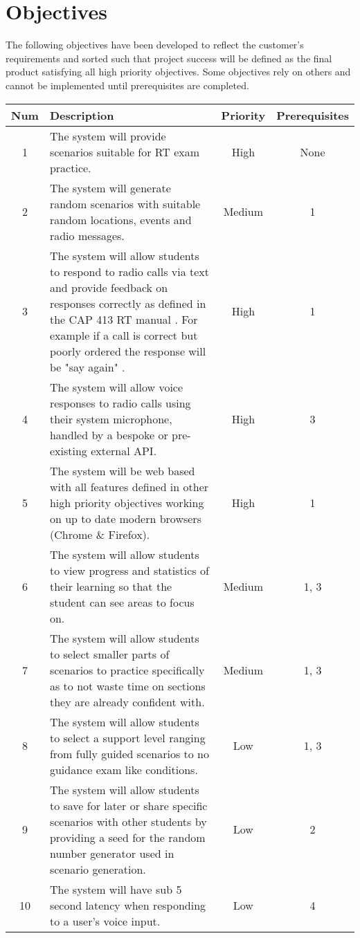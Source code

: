 \section{Objectives}
The following objectives have been developed to reflect the customer's requirements and sorted such that project success will be defined as the final product satisfying all high priority objectives. Some objectives rely on others and cannot be implemented until prerequisites are completed.

\begin{center}
    \begin{tabular}{ | c | m{22.7em} | c | c | }
        \hline
        \bf{Num} & \bf{Description} & \bf{Priority} & \bf{Prerequisites} \\
        \hline
        1 & The system will provide scenarios suitable for RT exam practice. & High & None \\
        \hline
        2 & The system will generate random scenarios with suitable random locations, events and radio messages. & Medium & 1 \\
        \hline
        3 & The system will allow students to respond to radio calls via text and provide feedback on responses correctly as defined in the CAP 413 RT manual \cite{CAP413}. For example if a call is correct but poorly ordered the response will be "say again" . & High & 1 \\
        \hline
        4 & The system will allow voice responses to radio calls using their system microphone, handled by a bespoke or pre-existing external API. & High & 3 \\
        \hline
        5 & The system will be web based with all features defined in other high priority objectives working on up to date modern browsers (Chrome \& Firefox). & High & 1 \\
        \hline
        6 & The system will allow students to view progress and statistics of their learning so that the student can see areas to focus on. & Medium & 1, 3 \\
        \hline
        7 & The system will allow students to select smaller parts of scenarios to practice specifically as to not waste time on sections they are already confident with. & Medium & 1, 3 \\
        \hline
        8 & The system will allow students to select a support level ranging from fully guided scenarios to no guidance exam like conditions. & Low & 1, 3 \\
        \hline
        9 & The system will allow students to save for later or share specific scenarios with other students by providing a seed for the random number generator used in scenario generation. & Low & 2 \\
        \hline
        10 & The system will have sub 5 second latency when responding to a user's voice input. & Low & 4 \\
        \hline
    \end{tabular}
\end{center}